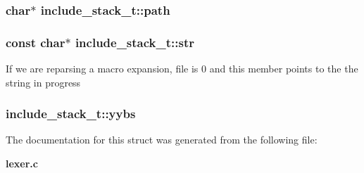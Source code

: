 \subsubsection{\setlength{\rightskip}{0pt plus 5cm}char$\ast$ include\_\-stack\_\-t::path}\label{structinclude__stack__t_m0}


\subsubsection{\setlength{\rightskip}{0pt plus 5cm}const char$\ast$ include\_\-stack\_\-t::str}\label{structinclude__stack__t_m2}


If we are reparsing a macro expansion, file is 0 and  this member points to the the string in progress 
\subsubsection{ include\_\-stack\_\-t::yybs}\label{structinclude__stack__t_m4}




The documentation for this struct was generated from the following file:\begin{CompactItemize}
\item 
{\bf lexer.c}\end{CompactItemize}

